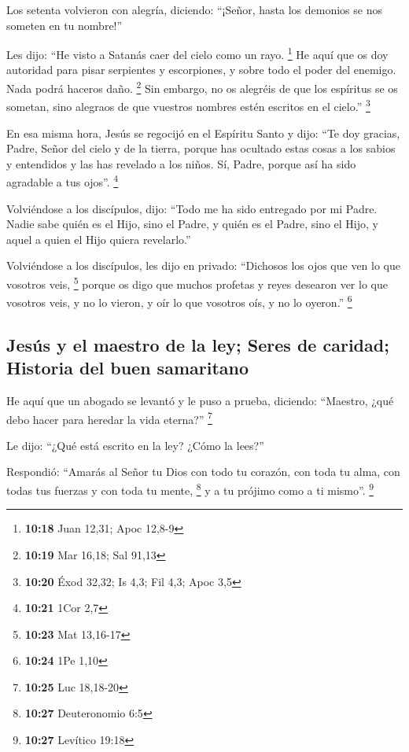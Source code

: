 \begin{paracol}{2}
 Los setenta volvieron con alegría, diciendo: ``¡Señor,
hasta los demonios se nos someten en tu nombre!''

 Les dijo: ``He visto a Satanás caer del cielo como un
rayo. \footnote{\textbf{10:18} Juan 12,31; Apoc 12,8-9} 
He aquí que os doy autoridad para pisar serpientes y escorpiones, y
sobre todo el poder del enemigo. Nada podrá haceros daño. \footnote{\textbf{10:19}
  Mar 16,18; Sal 91,13}  Sin embargo, no os alegréis de
que los espíritus se os sometan, sino alegraos de que vuestros nombres
estén escritos en el cielo.'' \footnote{\textbf{10:20} Éxod 32,32; Is
  4,3; Fil 4,3; Apoc 3,5}

 En esa misma hora, Jesús se regocijó en el Espíritu
Santo y dijo: ``Te doy gracias, Padre, Señor del cielo y de la tierra,
porque has ocultado estas cosas a los sabios y entendidos y las has
revelado a los niños. Sí, Padre, porque así ha sido agradable a tus
ojos''. \footnote{\textbf{10:21} 1Cor 2,7}

 Volviéndose a los discípulos, dijo: ``Todo me ha sido
entregado por mi Padre. Nadie sabe quién es el Hijo, sino el Padre, y
quién es el Padre, sino el Hijo, y aquel a quien el Hijo quiera
revelarlo.''

 Volviéndose a los discípulos, les dijo en privado:
``Dichosos los ojos que ven lo que vosotros veis, \footnote{\textbf{10:23}
  Mat 13,16-17}  porque os digo que muchos profetas y
reyes desearon ver lo que vosotros veis, y no lo vieron, y oír lo que
vosotros oís, y no lo oyeron.'' \footnote{\textbf{10:24} 1Pe 1,10}

\hypertarget{jesuxfas-y-el-maestro-de-la-ley-seres-de-caridad-historia-del-buen-samaritano}{%
\subsection{Jesús y el maestro de la ley; Seres de caridad; Historia del
buen
samaritano}\label{jesuxfas-y-el-maestro-de-la-ley-seres-de-caridad-historia-del-buen-samaritano}}

 He aquí que un abogado se levantó y le puso a prueba,
diciendo: ``Maestro, ¿qué debo hacer para heredar la vida eterna?''
\footnote{\textbf{10:25} Luc 18,18-20}

 Le dijo: ``¿Qué está escrito en la ley? ¿Cómo la lees?''

 Respondió: ``Amarás al Señor tu Dios con todo tu
corazón, con toda tu alma, con todas tus fuerzas y con toda tu mente,
\footnote{\textbf{10:27} Deuteronomio 6:5} y a tu prójimo como a ti
mismo''. \footnote{\textbf{10:27} Levítico 19:18}


\end{paracol}
